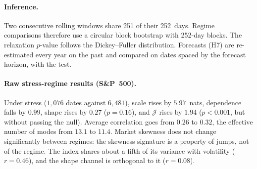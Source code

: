 \documentclass[11pt]{article}
\theoremstyle{definition}
\newcommand{\JJ}{\mathcal{J}}
\begin{document}
\paragraph{Inference.} Two consecutive rolling windows share 251 of their
252~days. Regime comparisons therefore use a circular block bootstrap with
252-day blocks. The relaxation $p$-value follows the Dickey--Fuller
distribution. Forecasts (H7) are re-estimated every year on the past and
compared on dates spaced by the forecast horizon, with the \citet{dm1995}
test.

\paragraph{Raw stress-regime results (S\&P~500).} Under stress ($1,076$ dates
against $6,481$), scale rises by $5.97$~nats, dependence falls by $0.99$,
shape rises by $0.27$ ($p=0.16$), and $\JJ$ rises by $1.94$ ($p<0.001$, but
without passing the null). Average correlation goes from $0.26$ to $0.32$, the
effective number of modes from $13.1$ to $11.4$. Market skewness does not
change significantly between regimes: the skewness signature is a property of
jumps, not of the regime. The index shares about a fifth of its variance with
volatility ($r=0.46$), and the shape channel is orthogonal to it ($r=0.08$).

\begin{table}[htbp]
\centering
\footnotesize
{}
\caption{S\&P~500: observed statistics against the i.i.d.\ null, 200
repetitions. $p$: share of repetitions at least as extreme in the predicted
direction. ``Wrong side'': the null exceeds the data. Gaps: stress minus
calm.}
\label{tab:placebo}
\end{table}

\begin{table}[htbp]
\centering
\footnotesize
{}
\caption{FF49 industries, 1990--2026: same conventions as
table~\ref{tab:placebo}.}
\label{tab:placebo-ff49}
\end{table}
\end{document}
